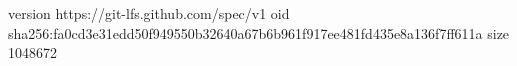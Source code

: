 version https://git-lfs.github.com/spec/v1
oid sha256:fa0cd3e31edd50f949550b32640a67b6b961f917ee481fd435e8a136f7ff611a
size 1048672
